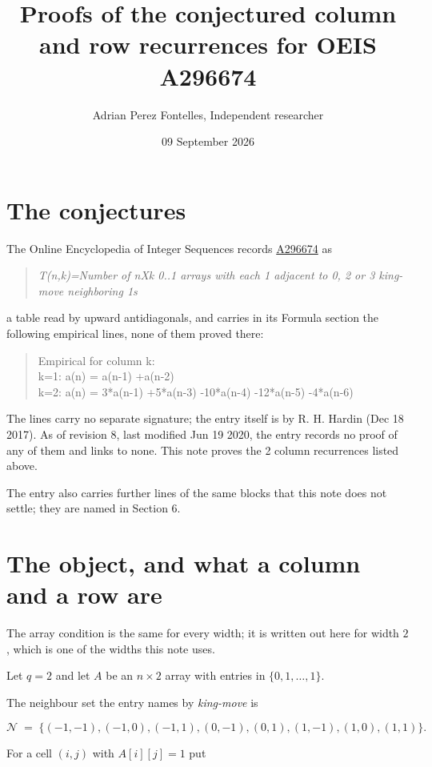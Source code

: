 \documentclass[11pt]{article}
\title{Proofs of the conjectured column and row recurrences for OEIS A296674}
\author{Adrian Perez Fontelles, Independent researcher}
\date{09 September 2026}
\theoremstyle{definition}
\begin{document}
\maketitle
\section{The conjectures}

The Online Encyclopedia of Integer Sequences records \href{https://oeis.org/A296674}{A296674} as

\begin{quote}\itshape T(n,k)=Number of nXk 0..1 arrays with each 1 adjacent to 0, 2 or 3 king-move neighboring 1s\end{quote}

a table read by upward antidiagonals, and carries in its Formula section the following empirical lines, none of them proved there:

\begin{quote}\ttfamily Empirical for column k:\\
k=1: a(n) = a(n-1) +a(n-2)\\k=2: a(n) = 3*a(n-1) +5*a(n-3) -10*a(n-4) -12*a(n-5) -4*a(n-6)\end{quote}

The lines carry no separate signature; the entry itself is by R. H. Hardin (Dec 18 2017). As of revision 8, last modified Jun 19 2020, the entry records no proof of any of them and links to none. This note proves the 2 column recurrences listed above.

The entry also carries further lines of the same blocks that this note does not settle; they are named in Section 6.

\section{The object, and what a column and a row are}

The array condition is the same for every width; it is written out here for width $2$, which is one of the widths this note uses.

Let $q = 2$ and let $A$ be an $n \times 2$ array with entries in $\{0,1,\dots,1\}$.

The neighbour set the entry names by {\itshape king-move} is

\[\mathcal{N} \;=\; \{(-1,-1), (-1,0), (-1,1), (0,-1), (0,1), (1,-1), (1,0), (1,1)\}.\]

For a cell $(i,j)$ with $A[i][j] = 1$ put
\end{document}
